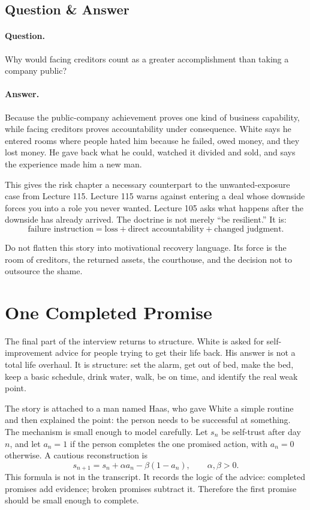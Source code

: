 \documentclass[11pt,oneside]{book}
\begin{document}
\subsection{Question \& Answer}

\paragraph{Question.}
Why would facing creditors count as a greater accomplishment than taking a company public?

\paragraph{Answer.}
Because the public-company achievement proves one kind of business capability, while facing creditors proves accountability under consequence. White says he entered rooms where people hated him because he failed, owed money, and they lost money. He gave back what he could, watched it divided and sold, and says the experience made him a new man.

This gives the risk chapter a necessary counterpart to the unwanted-exposure case from Lecture 115. Lecture 115 warns against entering a deal whose downside forces you into a role you never wanted. Lecture 105 asks what happens after the downside has already arrived. The doctrine is not merely ``be resilient.'' It is:
\[
\text{failure instruction}
=
\text{loss}
+
\text{direct accountability}
+
\text{changed judgment}.
\]

\begin{remark}
Do not flatten this story into motivational recovery language. Its force is the room of creditors, the returned assets, the courthouse, and the decision not to outsource the shame.
\end{remark}

\section{One Completed Promise}

The final part of the interview returns to structure. White is asked for self-improvement advice for people trying to get their life back. His answer is not a total life overhaul. It is structure: set the alarm, get out of bed, make the bed, keep a basic schedule, drink water, walk, be on time, and identify the real weak point.

The story is attached to a man named Haas, who gave White a simple routine and then explained the point: the person needs to be successful at something. The mechanism is small enough to model carefully. Let \(s_n\) be self-trust after day \(n\), and let \(a_n=1\) if the person completes the one promised action, with \(a_n=0\) otherwise. A cautious reconstruction is
\[
s_{n+1}=s_n+\alpha a_n-\beta(1-a_n),
\qquad
\alpha,\beta>0.
\]
This formula is not in the transcript. It records the logic of the advice: completed promises add evidence; broken promises subtract it. Therefore the first promise should be small enough to complete.
\end{document}
